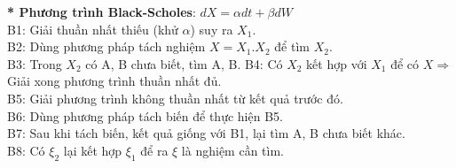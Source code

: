 \documentclass[14pt,a4paper]{article}
\numberwithin{equation}{section}
\begin{document}
\textbf{* Phương trình Black-Scholes}: $dX=\alpha dt+\beta dW$\\
B1: Giải thuần nhất thiếu (khử $\alpha$) suy ra $X_1$.\\
B2: Dùng phương pháp tách nghiệm $X=X_1.X_2$ để tìm $X_2$.\\
B3: Trong $X_2$ có A, B chưa biết, tìm A, B.
B4: Có $X_2$ kết hợp với $X_1$ để có $X\Rightarrow$ Giải xong phương trình thuần nhất đủ.\\
B5: Giải phương trình không thuần nhất từ kết quả trước đó.\\
B6: Dùng phương pháp tách biến để thực hiện B5.\\
B7: Sau khi tách biến, kết quả giống với B1, lại tìm A, B chưa biết khác.\\
B8: Có $\xi_2$ lại kết hợp $\xi_1$ để ra $\xi$ là nghiệm cần tìm.
\end{document}
